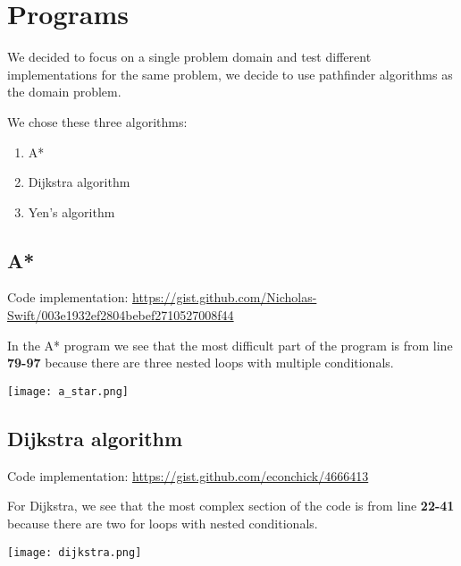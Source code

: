 \section{Programs}
We decided to focus on a single problem domain and test different implementations for the same problem, we decide to use pathfinder algorithms as the domain problem.\newline

\noindent
We chose these three algorithms:
\begin{enumerate}
    \item A*
    \item Dijkstra algorithm
    \item Yen's algorithm
\end{enumerate}

\pagebreak

\subsection{A*}

Code implementation: \newline
\url{https://gist.github.com/Nicholas-Swift/003e1932ef2804bebef2710527008f44} \newline\newline

\noindent
In the A* program we see that the most difficult part of the program is from line \textbf{79-97} because there are three nested loops with multiple conditionals.
\begin{center}
    \texttt{[image: a\_star.png]}    
\end{center}

\pagebreak

\subsection{Dijkstra algorithm}
Code implementation: \newline
\url{https://gist.github.com/econchick/4666413} \newline\newline

\noindent
For Dijkstra, we see that the most complex section of the code is from line \textbf{22-41} because there are two for loops with nested conditionals.

\begin{center}
    \texttt{[image: dijkstra.png]}    
\end{center}

